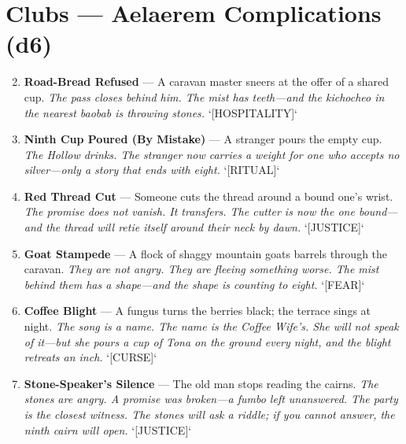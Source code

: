 \section*{Clubs --- Aelaerem Complications (d6)}
\label{subsec:aelaerem-complications}
\begin{enumerate}
\setcounter{enumi}{1}
\item \textbf{Road-Bread Refused} --- A caravan master sneers at the offer of a shared cup.
  \hfill \textit{The pass closes behind him. The mist has teeth---and the \textit{kichocheo} in the nearest baobab is throwing stones.} `[HOSPITALITY]`
\item \textbf{Ninth Cup Poured (By Mistake)} --- A stranger pours the empty cup.
  \hfill \textit{The Hollow drinks. The stranger now carries a weight for one who accepts no silver---only a story that ends with eight.} `[RITUAL]`
\item \textbf{Red Thread Cut} --- Someone cuts the thread around a bound one's wrist.
  \hfill \textit{The promise does not vanish. It transfers. The cutter is now the one bound---and the thread will retie itself around their neck by dawn.} `[JUSTICE]`
\item \textbf{Goat Stampede} --- A flock of shaggy mountain goats barrels through the caravan.
  \hfill \textit{They are not angry. They are fleeing something worse. The mist behind them has a shape---and the shape is counting to eight.} `[FEAR]`
\item \textbf{Coffee Blight} --- A fungus turns the berries black; the terrace sings at night.
  \hfill \textit{The song is a name. The name is the Coffee Wife's. She will not speak of it---but she pours a cup of \textit{Tona} on the ground every night, and the blight retreats an inch.} `[CURSE]`
\item \textbf{Stone-Speaker's Silence} --- The old man stops reading the cairns.
  \hfill \textit{The stones are angry. A promise was broken---a \textit{fumbo} left unanswered. The party is the closest witness. The stones will ask a riddle; if you cannot answer, the ninth cairn will open.} `[JUSTICE]`
\end{enumerate}

